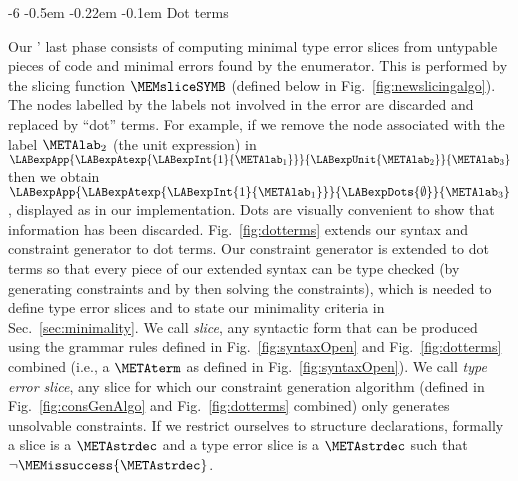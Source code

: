 \documentclass{jfp1}
\makeatletter
\def\subsubsection{\@startsection{subsubsection}{3}{\z@}{-0.2\baselineskip plus -0.1\baselineskip minus -0.1\baselineskip}%
    {-0.5em \@plus -0.22em \@minus -0.1em}{\normalfont\normalsize\bfseries}}%
\newcommand{\sectiontitledot}[1]{#1.}
\renewcommand\subsubsection{\@startsection{subsubsection}{3}{\z@}%
                            {-6\p@ \@plus -1\p@ \@minus -1\p@}%
                            {-0.5em \@plus -0.22em \@minus -0.1em}%
                            {\normalfont\normalsize\bfseries\boldmath\sectiontitledot}}
\makeatother
\begin{document}
\subsubsection{Dot terms}
\label{sec:dotterms}


Our \TES' last phase consists of computing minimal type error slices
from untypable pieces of code and minimal errors found by the
enumerator.  This is performed by the slicing function $\MEMsliceSYMB$
(defined below in Fig.~\ref{fig:newslicingalgo}).
%
The nodes labelled by the labels not involved in the error are
discarded and replaced by ``dot'' terms.
%
For example, if we remove the node associated with the label
$\METAlab_2$ (the unit expression) in
$\LABexpApp{\LABexpAtexp{\LABexpInt{1}{\METAlab_1}}}{\LABexpUnit{\METAlab_2}}{\METAlab_3}$
then we obtain
$\LABexpApp{\LABexpAtexp{\LABexpInt{1}{\METAlab_1}}}{\LABexpDots{\emptyset}}{\METAlab_3}$,
displayed as  in our implementation.
%
Dots are visually convenient to show that information has
been discarded.
%
Fig.~\ref{fig:dotterms} extends our syntax and constraint generator to
dot terms.  Our constraint generator is extended to dot terms so that
every piece of our extended syntax can be type checked (by generating
constraints and by then solving the constraints), which is needed to
define type error slices and to state our minimality criteria in
Sec.~\ref{sec:minimality}.
%
We call
%
%
%
\textit{slice}, any syntactic form that can be produced using
the grammar rules defined in Fig.~\ref{fig:syntaxOpen} and
Fig.~\ref{fig:dotterms} combined (i.e., a $\METAterm$ as defined in
Fig.~\ref{fig:syntaxOpen}).
%
We call
%
%
%
\textit{type error slice}, any slice for which our constraint
generation algorithm (defined in Fig.~\ref{fig:consGenAlgo} and
Fig.~\ref{fig:dotterms} combined) only generates unsolvable
constraints.
%
If we restrict ourselves to structure declarations, formally a slice
is a $\METAstrdec$ and a type error slice is a $\METAstrdec$ such that
$\neg\MEMissuccess{\METAstrdec}$.
\end{document}
